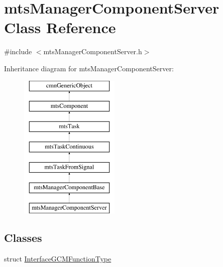 \hypertarget{classmts_manager_component_server}{\section{mts\-Manager\-Component\-Server Class Reference}
\label{classmts_manager_component_server}
}


{\ttfamily \#include $<$mts\-Manager\-Component\-Server.\-h$>$}

Inheritance diagram for mts\-Manager\-Component\-Server\-:\begin{figure}[H]
\begin{center}
\leavevmode
\includegraphics[height=7.000000cm]{d6/d5e/classmts_manager_component_server}
\end{center}
\end{figure}
\subsection*{Classes}
\begin{DoxyCompactItemize}
\item 
struct \hyperlink{structmts_manager_component_server_1_1_interface_g_c_m_function_type}{Interface\-G\-C\-M\-Function\-Type}
\end{DoxyCompactItemize}
